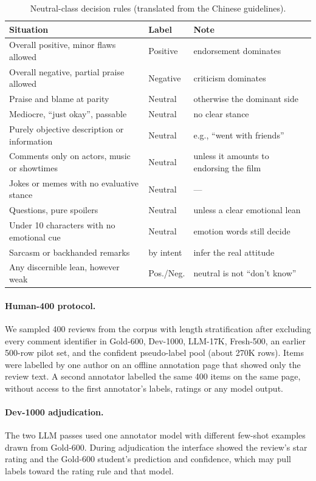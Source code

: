 \begin{table}[h]
\centering\footnotesize
\setlength{\tabcolsep}{3pt}
\begin{tabular}{@{}p{4.6cm}p{1.4cm}p{1.5cm}@{}}
\toprule
Situation & Label & Note \\
\midrule
Overall positive, minor flaws allowed & Positive & endorsement dominates \\
Overall negative, partial praise allowed & Negative & criticism dominates \\
\midrule
Praise and blame at parity & Neutral & otherwise the dominant side \\
Mediocre, ``just okay'', passable & Neutral & no clear stance \\
Purely objective description or information & Neutral & e.g., ``went with friends'' \\
Comments only on actors, music or showtimes & Neutral & unless it amounts to endorsing the film \\
Jokes or memes with no evaluative stance & Neutral & --- \\
Questions, pure spoilers & Neutral & unless a clear emotional lean \\
Under 10 characters with no emotional cue & Neutral & emotion words still decide \\
Sarcasm or backhanded remarks & by intent & infer the real attitude \\
\midrule
Any discernible lean, however weak & Pos./Neg. & neutral is not ``don't know'' \\
\bottomrule
\end{tabular}
\caption{Neutral-class decision rules (translated from the Chinese
guidelines).}
\label{tab:neutral-rules}
\end{table}

\paragraph{Human-400 protocol.}
We sampled 400 reviews from the corpus with length stratification
after excluding every comment identifier in Gold-600, Dev-1000,
LLM-17K, Fresh-500, an earlier 500-row pilot set, and the
confident pseudo-label pool (about 270K rows). Items were labelled
by one author on an offline annotation page that showed only the
review text.
\ifSfive A second annotator labelled the same 400 items on the same
page, without access to the first annotator's labels, ratings or any
model output.\fi

\paragraph{Dev-1000 adjudication.}
The two LLM passes used one annotator model with different few-shot
examples drawn from Gold-600. During adjudication the interface
showed the review's star rating and the Gold-600 student's prediction
and confidence, which may pull labels toward the rating rule and that
model.

